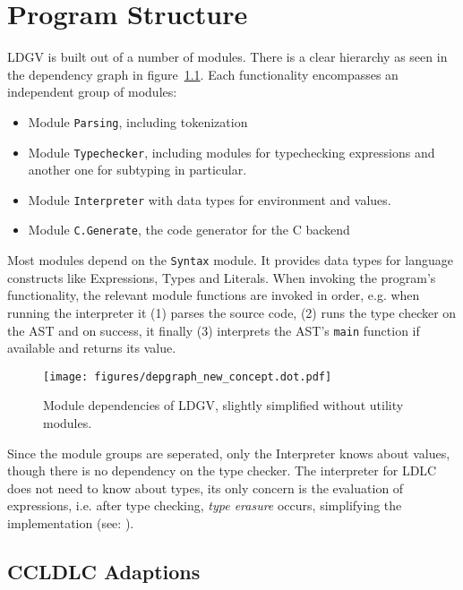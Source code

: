 \chapter{Program Structure}\label{chap:Program Structure}

LDGV is built out of a number of modules. There is a clear hierarchy as seen in the dependency graph in figure~\ref{fig:dependency-graph}. Each functionality encompasses an independent group of modules:

\begin{itemize}
 \item Module \texttt{Parsing}, including tokenization
 \item Module \texttt{Typechecker}, including modules for typechecking expressions and another one for subtyping in particular.
 \item Module \texttt{Interpreter} with data types for environment and values.
 \item Module \texttt{C.Generate}, the code generator for the C backend
\end{itemize}

Most modules depend on the \texttt{Syntax} module. It provides data types for language constructs like Expressions, Types and Literals. When invoking the program's functionality, the relevant module functions are invoked in order, e.g. when running the interpreter it (1) parses the source code, (2) runs the type checker on the AST and on success, it finally (3) interprets the AST's \texttt{main} function if available and returns its value.

\begin{figure}
 \centering
 \texttt{[image: figures/depgraph\_new\_concept.dot.pdf]}
 \caption{Module dependencies of LDGV, slightly simplified without utility modules.}
 \label{fig:dependency-graph}
\end{figure}

Since the module groups are seperated, only the Interpreter knows about values, though there is no dependency on the type checker. The interpreter for LDLC does not need to know about types, its only concern is the evaluation of expressions, i.e. after type checking, \emph{type erasure} occurs, simplifying the implementation (see: \cite{crary2002}).

\section{CCLDLC Adaptions}

